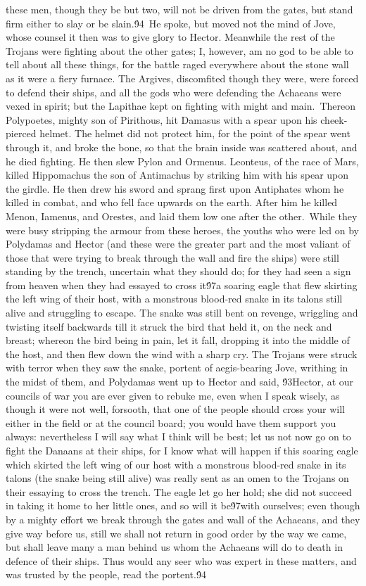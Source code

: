 {these men, though they be but two, will not be driven from the gates, but stand firm either to slay or be slain.\'94\
He spoke, but moved not the mind of Jove, whose counsel it then was to give glory to Hector. Meanwhile the rest of the Trojans were fighting about the other gates; I, however, am no god to be able to tell about all these things, for the battle raged everywhere about the stone wall as it were a fiery furnace. The Argives, discomfited though they were, were forced to defend their ships, and all the gods who were defending the Achaeans were vexed in spirit; but the Lapithae kept on fighting with might and main.\
Thereon Polypoetes, mighty son of Pirithous, hit Damasus with a spear upon his cheek-pierced helmet. The helmet did not protect him, for the point of the spear went through it, and broke the bone, so that the brain inside was scattered about, and he died fighting. He then slew Pylon and Ormenus. Leonteus, of the race of Mars, killed Hippomachus the son of Antimachus by striking him with his spear upon the girdle. He then drew his sword and sprang first upon Antiphates whom he killed in combat, and who fell face upwards on the earth. After him he killed Menon, Iamenus, and Orestes, and laid them low one after the other.\
While they were busy stripping the armour from these heroes, the youths who were led on by Polydamas and Hector (and these were the greater part and the most valiant of those that were trying to break through the wall and fire the ships) were still standing by the trench, uncertain what they should do; for they had seen a sign from heaven when they had essayed to cross it\'97a soaring eagle that flew skirting the left wing of their host, with a monstrous blood-red snake in its talons still alive and struggling to escape. The snake was still bent on revenge, wriggling and twisting itself backwards till it struck the bird that held it, on the neck and breast; whereon the bird being in pain, let it fall, dropping it into the middle of the host, and then flew down the wind with a sharp cry. The Trojans were struck with terror when they saw the snake, portent of aegis-bearing Jove, writhing in the midst of them, and Polydamas went up to Hector and said, \'93Hector, at our councils of war you are ever given to rebuke me, even when I speak wisely, as though it were not well, forsooth, that one of the people should cross your will either in the field or at the council board; you would have them support you always: nevertheless I will say what I think will be best; let us not now go on to fight the Danaans at their ships, for I know what will happen if this soaring eagle which skirted the left wing of our host with a monstrous blood-red snake in its talons (the snake being still alive) was really sent as an omen to the Trojans on their essaying to cross the trench. The eagle let go her hold; she did not succeed in taking it home to her little ones, and so will it be\'97with ourselves; even though by a mighty effort we break through the gates and wall of the Achaeans, and they give way before us, still we shall not return in good order by the way we came, but shall leave many a man behind us whom the Achaeans will do to death in defence of their ships. Thus would any seer who was expert in these matters, and was trusted by the people, read the portent.\'94\
}
